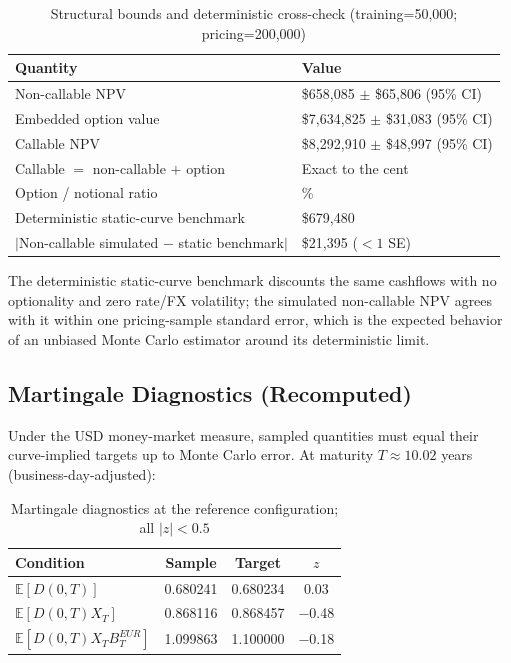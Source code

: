 \documentclass[conference]{IEEEtran}
\newcommand{\E}{\mathbb{E}}
\begin{document}
\begin{table}[H]
\centering
\begin{tabularx}{\columnwidth}{>{\raggedright\arraybackslash}p{}>{\raggedright\arraybackslash}X}
\toprule
\textbf{Quantity} & \textbf{Value} \\
\midrule
Non-callable NPV & \$658,085 $\pm$ \$65,806 (95\% CI) \\
Embedded option value & \$7,634,825 $\pm$ \$31,083 (95\% CI) \\
Callable NPV & \$8,292,910 $\pm$ \$48,997 (95\% CI) \\
Callable $=$ non-callable $+$ option & \textcolor{pass}{Exact to the cent} \\
Option / notional ratio & 7.63\% \\
Deterministic static-curve benchmark & \$679,480 \\
$|$Non-callable simulated $-$ static benchmark$|$ & \$21,395 ($<1$ SE) \\
\bottomrule
\end{tabularx}
\caption{Structural bounds and deterministic cross-check (training=50,000; pricing=200,000)}
\end{table}

The deterministic static-curve benchmark discounts the same cashflows with no optionality and zero rate/FX volatility; the simulated non-callable NPV agrees with it within one pricing-sample standard error, which is the expected behavior of an unbiased Monte Carlo estimator around its deterministic limit.

\subsection{Martingale Diagnostics (Recomputed)}

Under the USD money-market measure, sampled quantities must equal their curve-implied targets up to Monte Carlo error. At maturity $T\approx10.02$ years (business-day-adjusted):

\begin{table}[H]
\centering
\begin{tabular}{lccc}
\toprule
\textbf{Condition} & \textbf{Sample} & \textbf{Target} & \textbf{$z$} \\
\midrule
$\E[D(0,T)]$ & 0.680241 & 0.680234 & 0.03 \\
$\E[D(0,T)X_T]$ & 0.868116 & 0.868457 & $-$0.48 \\
$\E[D(0,T)X_T B_T^{EUR}]$ & 1.099863 & 1.100000 & $-$0.18 \\
\bottomrule
\end{tabular}
\caption{Martingale diagnostics at the reference configuration; all $|z|<0.5$}
\end{table}
\end{document}

